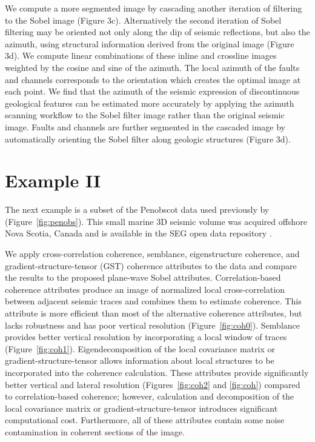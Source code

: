 We compute a more segmented image by cascading another iteration of filtering to the Sobel image (Figure 3c).
Alternatively the second iteration of Sobel filtering may be oriented not only along the dip of seismic reflections, but also the azimuth, using structural information derived from the original image (Figure 3d).
We compute linear combinations of these inline and crossline images weighted by the cosine and sine of the azimuth.
The local azimuth of the faults and channels corresponds to the orientation which creates the optimal image at each point.
We find that the azimuth of the seismic expression of discontinuous geological features can be estimated more accurately by applying the azimuth scanning workflow to the Sobel filter image rather than the original seismic image.
Faults and channels are further segmented in the cascaded image by automatically orienting the Sobel filter along geologic structures (Figure 3d).


\section{Example II}
The next example is a subset of the Penobscot data used previously by \cite{kington} (Figure~\ref{fig:penobs}).
This small marine 3{D} seismic volume was acquired offshore Nova Scotia, Canada and is available in the SEG open data repository \cite[]{penobscot}.


We apply cross-correlation coherence, semblance, eigenstructure coherence, and gradient-structure-tensor (GST) coherence attributes to the data and compare the results to the proposed plane-wave Sobel attributes. 
Correlation-based coherence attributes \cite[]{bahorich} produce an image of normalized local cross-correlation between adjacent seismic traces and combines them to estimate coherence.
This attribute is more efficient than most of the alternative coherence attributes, but lacks robustness and has poor vertical resolution (Figure~\ref{fig:coh0}).
Semblance \cite[]{marfurt98} provides better vertical resolution by incorporating a local window of traces (Figure~\ref{fig:coh1}).
Eigendecomposition of the local covariance matrix \cite[]{gersztenkorn} or gradient-structure-tensor \cite[]{randen00} allows information about local structures to be incorporated into the coherence calculation.
These attributes provide significantly better vertical and lateral resolution (Figures~\ref{fig:coh2} and \ref{fig:coh}) compared to correlation-based coherence; however, calculation and decomposition of the local covariance matrix or gradient-structure-tensor introduces significant computational cost.
Furthermore, all of these attributes contain some noise contamination in coherent sections of the image.

